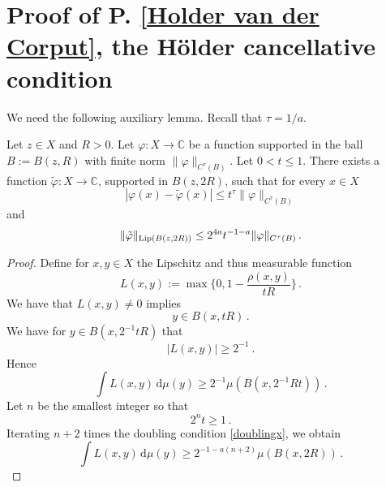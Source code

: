 {\section{Proof of P. \ref{Holder van der Corput}, the H\"older cancellative condition}
\label{liphoel}

We need the following auxiliary lemma.
Recall that $\tau = 1/a$.

\begin{lemma}
    \label{lem regularity aux}
    Let $z\in X$ and $R>0$. Let $\varphi: X \to \mathbb{C}$ be a function supported in the  ball
    $B:=B(z,R)$ with finite norm $\|\varphi\|_{C^\tau(B)}$. Let $0<t \leq 1$. There exists a function $\tilde \varphi : X \to \mathbb{C}$, supported in $B(z,2R)$, such that for every $x\in X$
    \begin{equation}\label{eq firstt}
        |\varphi(x) - \tilde \varphi(x)| \leq t^{\tau} \|\varphi\|_{C^\tau(B)}
    \end{equation}and
   \begin{equation}\label{eq secondt}
       \|\tilde \varphi\|_{\operatorname{\operatorname{Lip}}(B(z,2R))} \leq 2^{4a}t^{-1-a} \|\varphi\|_{C^{\tau}(B)}\, .
   \end{equation}
\end{lemma}


\begin{proof}
    Define for $x,y\in X$ the Lipschitz  and thus measurable function
     \begin{equation}
           L(x,y) := \max\{0, 1 - \frac{\rho(x,y)}{tR}\}\, .
    \end{equation}
We  have that $L(x,y)\neq 0$ implies
\begin{equation}\label{eql01}
    y\in B(x, tR)\, .
\end{equation}
We have for $y\in B(x, 2^{-1}tR)$ that
\begin{equation}\label{eql30}
           |L(x,y)|\ge 2^{-1}  \ .
    \end{equation}
Hence
\begin{equation}
        \int L(x,y) \, \mathrm{d}\mu(y)\ge  2^{-1}\mu(B(x, 2^{-1}Rt))\, .
    \end{equation}
 Let $n$ be the smallest integer so that
 \begin{equation}\label{2nt1}
     2^nt\ge 1\, .
 \end{equation} Iterating $n+2$ times the doubling condition \eqref{doublingx}, we obtain
      \begin{equation}\label{eql32}
        \int L(x,y) \, \mathrm{d}\mu(y)\ge  2^{-1-a(n+2)}\mu(B(x, 2R))\, .
    \end{equation}


\end{proof}}
